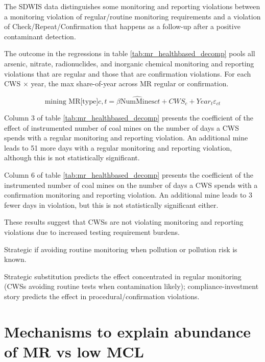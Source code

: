 \documentclass{article}
\begin{document}
The SDWIS data distinguishes some monitoring and reporting violations between a monitoring violation of regular/routine monitoring requirements and a violation of Check/Repeat/Confirmation that happens as a follow-up after a positive contaminant detection. 

The outcome in the regressions in table \ref{tab:mr_healthbased_decomp} pools all arsenic, nitrate, radionuclides, and inorganic chemical monitoring and reporting violations that are regular and those that are confirmation violations. For each CWS × year, the max share-of-year across MR regular or confirmation.

\begin{equation}
\text{mining MR[type]}{c,t} = \beta  \widehat{\text{NumMines}}{ct} + CWS_c + Year_t \varepsilon_{ct}    
\end{equation}

Column 3 of table \ref{tab:mr_healthbased_decomp} presents the coefficient of the effect of instrumented number of coal mines on the number of days a CWS spends with a regular monitoring and reporting violation. An additional mine leads to 51 more days with a regular monitoring and reporting violation, although this is not statistically significant.

Column 6 of table \ref{tab:mr_healthbased_decomp} presents the coefficient of the instrumented number of coal mines on the number of days a CWS spends with a confirmation monitoring and reporting violation. An additional mine leads to 3 fewer days in violation, but this is not statistically significant either.

These results suggest that CWSs are not violating monitoring and reporting violations due to increased testing requirement burdens.

Strategic if avoiding routine monitoring when pollution or pollution risk is known.

Strategic substitution predicts the effect concentrated in regular monitoring (CWSs avoiding routine tests when contamination likely); compliance-investment story predicts the effect in procedural/confirmation violations.



\section{Mechanisms to explain abundance of MR vs low MCL}


\end{document}

